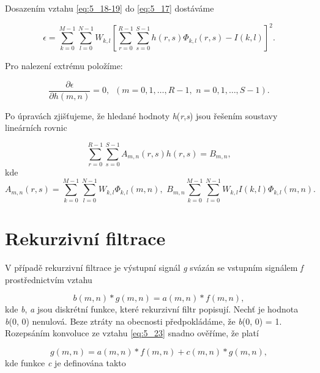 Dosazením vztahu \eqref{eq:5_18-19} do \eqref{eq:5_17} dostáváme

\begin{equation} \label{eq:5_20}
    \epsilon = \sum\limits_{k=0}^{M-1} \sum\limits_{l=0}^{N-1} W_{k, l} \left[ \sum\limits_{r=0}^{R-1} \sum\limits_{s=0}^{S-1} h(r, s) \Phi_{k, l} (r, s) - I(k, l) \right]^2.
\end{equation}

Pro nalezení extrému položíme:

\begin{equation} \label{eq:5_21}
    \frac{\partial\epsilon}{\partial h(m, n)} = 0, \,\,\, (m = 0, 1, \dots, R-1, \,\, n = 0, 1, \dots, S - 1 ).
\end{equation}

Po úpravách zjišťujeme, že hledané hodnoty \textit{h}(\textit{r},\textit{s}) jsou řešením soustavy lineárních rovnic

\begin{equation} \label{eq:5_22}
    \sum\limits_{r=0}^{R-1} \sum\limits_{s=0}^{S-1} A_{m, n} (r, s) h(r, s) = B_{m, n},
\end{equation}
kde
\begin{equation}
    A_{m, n} (r, s) = \sum\limits_{k=0}^{M-1} \sum\limits_{l=0}^{N-1} W_{k, l} \Phi_{k, l} (m, n), \,\, B_{m, n} \sum\limits_{k=0}^{M-1} \sum\limits_{l=0}^{N-1} W_{k, l} I(k, l) \Phi_{k, l} (m, n). \nonumber
\end{equation}

\section*{Rekurzivní filtrace}

V případě rekurzivní filtrace je výstupní signál \textit{g} svázán se vstupním signálem \textit{f} prostřednictvím vztahu

\begin{equation} \label{eq:5_23}
    b(m, n) * g(m, n) = a(m, n) * f(m, n),
\end{equation}
kde \textit{b}, \textit{a} jsou diskrétní funkce, které rekurzivní filtr popisují. Nechť je hodnota \textit{b}(0, 0) nenulová. Beze ztráty na obecnosti předpokládáme, že \textit{b}(0, 0) = 1. Rozepsáním konvoluce ze vztahu \eqref{eq:5_23} snadno ověříme, že platí 

\begin{equation} \label{eq:5_24}
    g(m, n) = a(m, n) * f(m, n) + c(m, n) * g(m, n),
\end{equation}
kde funkce \textit{c} je definována takto

